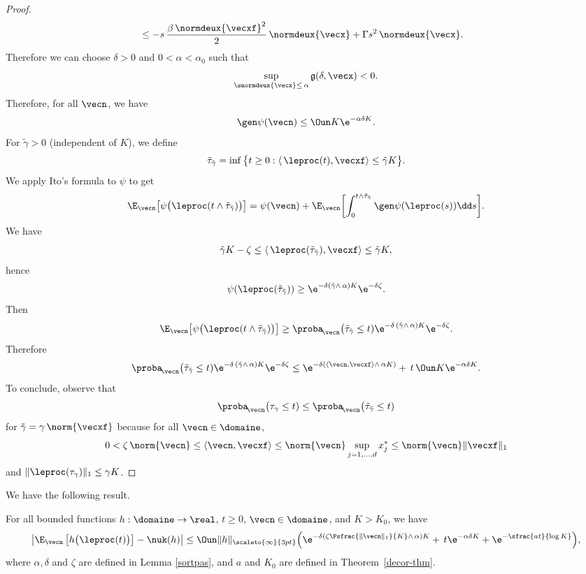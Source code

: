 \begin{proof}
\begin{align*}
& \le -s\,\frac{\beta\,\normdeux{\vecxf}^{2}}{2}\,\normdeux{\vecx} +\Gamma s^{2}\, \normdeux{\vecx}.
\end{align*}
Therefore we can choose $\delta>0$ and $0<\alpha<\alpha_0$ such that
\[
\sup_{\snormdeux{\vecx}\le\, \alpha}\mathfrak{g}(\delta,\vecx)<0.
\]
Therefore, for all $\vecn$, we have
\[
\gen \psi(\vecn)\le \Oun K \e^{-\alpha\delta K}.
\]
For $\tilde{\gamma}>0$ (independent of $K$), we define
\[
\tilde{\tau}_{\tilde \gamma}=\inf\big\{t\geq 0 : \langle\, \leproc(t),\vecxf\rangle\le \tilde \gamma K\big\}.
\]
We apply Ito's formula to $\psi$ to get
\[
\E_{\vecn}\bigl[\psi\bigl(\leproc(t\wedge\tilde{\tau}_{\tilde \gamma})\bigr)\bigr]
=\psi(\vecn)+\E_{\vecn}\biggl[\int_{0}^{t\wedge\tilde{\tau}_{\tilde \gamma}}\gen\psi(\leproc(s))\dd s\biggr].
\]
We have
\[
\tilde{\gamma}K-\zeta \leq \langle\, \leproc(\tilde{\tau}_{\tilde \gamma}),\vecxf\rangle \leq \tilde{\gamma} K,
\]
hence
\[
\psi(\leproc(\tilde{\tau}_{\tilde \gamma}))\geq \e^{-\delta(\tilde{\gamma}\wedge\, \alpha)K} \e^{-\delta \zeta}.
\]
Then
\[
\E_{\vecn}\bigl[\psi\bigl(\leproc(t\wedge\tilde{\tau}_{\tilde \gamma})\bigr)\bigr]
\geq \proba_{\!\vecn}\bigl(\tilde{\tau}_{\tilde \gamma}\leq t)\e^{-\delta\,(\tilde \gamma\wedge\, \alpha) K}\e^{-\delta \zeta}.
\]
Therefore
\[
\proba_{\!\vecn}\bigl(\tilde{\tau}_{\tilde \gamma}\leq t)\e^{-\delta\,(\tilde \gamma\wedge\,\alpha) K}\e^{-\delta \zeta}
\le \e^{-\delta(\langle \vecn,\vecxf\rangle \wedge\,\alpha K)}+\,t\, \Oun K \e^{-\alpha\delta K}.
\]
To conclude, observe that
\[
\proba_{\!\vecn}\bigl(\tau_{\gamma}\leq t)
\leq
\proba_{\!\vecn}\bigl(\tilde{\tau}_{\tilde \gamma}\leq t)
\]
for $\tilde{\gamma}=\gamma\, \norm{\vecxf}$ because for all $\vecn\in\domaine$,
\[
0<\zeta\, \norm{\vecn} \leq \langle \vecn,\vecxf \rangle
\leq \norm{\vecn}\sup_{j=1,\ldots,d} x^*_{j} \leq \norm{\vecn} \|\vecxf\|_1
\]
and $\| \leproc(\tau_{\gamma})\|_1\leq \gamma K$.
\end{proof}

We have the following result.

\begin{proposition}
\label{pre-theorem-ergodic}
For all bounded functions $h:\domaine\to\real$, $t\ge 0$, $\vecn\in \domaine$, and $K>K_{0}$, we have
\[
\left|\E_{\vecn}\left[h\bigl(\leproc(t)\bigr)\right]-\nuk(h)\right|
\le \Oun \|h\|_{\scaleto{\infty}{3pt}}\Bigl(\e^{-\delta\left(\zeta\Psfrac{\|\vecn\|_{1}}{K}\wedge\,\alpha\right) K}
+\, t \e^{-\alpha\delta K}+\e^{-\sfrac{a t}{\log K}}\Bigr),
\]
where $\alpha, \delta$ and $\zeta$ are defined in Lemma \ref{sortpas}, and $a$ and $K_0$ are defined in Theorem~\ref{decor-thm}.
\end{proposition}

